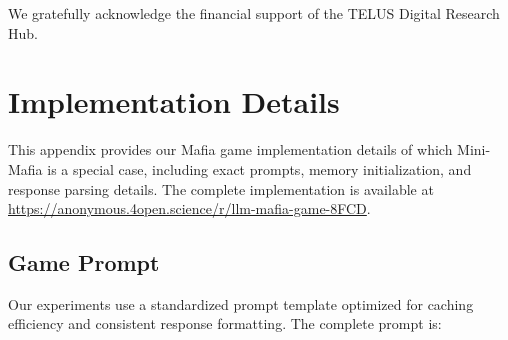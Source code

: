\documentclass[sigconf,anonymous,balance=false]{aamas}
\begin{document}
\begin{acks}
    We gratefully acknowledge the financial support of the TELUS Digital Research Hub.
\end{acks}





\appendix

\section{Implementation Details}
\label{appendix:experimental_details}

This appendix provides our Mafia game implementation details of which Mini-Mafia is a special case, including exact prompts, memory initialization, and response parsing details. The complete implementation is available at \url{https://anonymous.4open.science/r/llm-mafia-game-8FCD}.

\subsection{Game Prompt}

Our experiments use a standardized prompt template optimized for caching efficiency and consistent response formatting. The complete prompt is:
\end{document}
